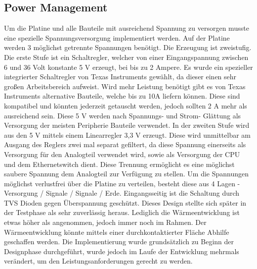 \documentclass[praktikum,german]{hgbthesis}
\begin{document}
\subsection{Power Management}
Um die Platine und alle Bauteile mit ausreichend Spannung zu versorgen musste eine spezielle Spannungsversorgung implementiert werden.
Auf der Platine werden 3 möglichst getrennte Spannungen benötigt. Die Erzeugung ist zweistufig. Die erste Stufe ist ein Schaltregler, welcher von einer Eingangspannung zwischen 6 und 36 Volt konstante 5 V erzeugt, bei bis zu 2 Ampere. Es wurde ein spezieller integrierter Schaltregler von Texas Instruments gewählt, da dieser einen sehr großen Arbeitsbereich aufweist. Wird mehr Leistung benötigt gibt es von Texas Instruments alternative Bauteile, welche bis zu 10A liefern können. Diese sind kompatibel und könnten jederzeit getauscht werden, jedoch sollten 2 A mehr als ausreichend sein. Diese 5 V werden nach Spannungs- und Strom- Glättung als Versorgung der meisten Peripherie Bauteile verwendet. In der zweiten Stufe wird aus den 5 V mittels einem Linearregler 3,3 V erzeugt. Diese wird unmittelbar am Ausgang des Reglers zwei mal separat gefiltert, da diese Spannung einerseits als Versorgung für den Analogteil verwendet wird, sowie als Versorgung der CPU und dem Ethernetswitch dient. Diese Trennung ermöglicht es eine möglichst saubere Spannung dem Analogteil zur Verfügung zu stellen. Um die Spannungen möglichst verlustfrei über die Platine zu verteilen, besteht diese aus 4 Lagen - Versorgung / Signale / Signale / Erde. Eingangsseitig ist die Schaltung durch TVS Dioden gegen Überspannung geschützt.
Dieses Design stellte sich später in der Testphase als sehr zuverlässig heraus. Lediglich die Wärmeentwicklung ist etwas höher als angenommen, jedoch immer noch im Rahmen. Der Wärmeentwicklung könnte mittels einer durchkontaktierter Fläche Abhilfe geschaffen werden. Die Implementierung wurde grundsätzlich zu Beginn der Designphase durchgeführt, wurde jedoch im Laufe der Entwicklung mehrmals verändert, um den Leistungsanforderungen gerecht zu werden.
\end{document}
